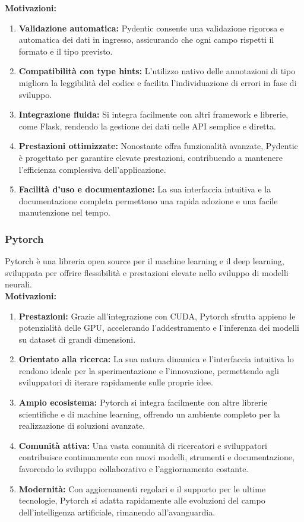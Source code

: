\textbf{Motivazioni:}
\begin{enumerate}
    \item \textbf{Validazione automatica:} Pydentic consente una validazione rigorosa e automatica dei dati in ingresso, assicurando che ogni campo rispetti il formato e il tipo previsto.
    \item \textbf{Compatibilità con type hints:} L'utilizzo nativo delle annotazioni di tipo migliora la leggibilità del codice e facilita l'individuazione di errori in fase di sviluppo.
    \item \textbf{Integrazione fluida:} Si integra facilmente con altri framework e librerie, come Flask, rendendo la gestione dei dati nelle API semplice e diretta.
    \item \textbf{Prestazioni ottimizzate:} Nonostante offra funzionalità avanzate, Pydentic è progettato per garantire elevate prestazioni, contribuendo a mantenere l'efficienza complessiva dell'applicazione.
    \item \textbf{Facilità d'uso e documentazione:} La sua interfaccia intuitiva e la documentazione completa permettono una rapida adozione e una facile manutenzione nel tempo.
\end{enumerate}


\subsubsection{Pytorch}
\label{subsubsec:pytorch}

Pytorch è una libreria open source per il machine learning e il deep learning, sviluppata per offrire flessibilità e prestazioni elevate nello sviluppo di modelli neurali.\\

\textbf{Motivazioni:}
\begin{enumerate}
    \item \textbf{Prestazioni:} Grazie all'integrazione con CUDA, Pytorch sfrutta appieno le potenzialità delle GPU, accelerando l'addestramento e l'inferenza dei modelli su dataset di grandi dimensioni.
    \item \textbf{Orientato alla ricerca:} La sua natura dinamica e l'interfaccia intuitiva lo rendono ideale per la sperimentazione e l'innovazione, permettendo agli sviluppatori di iterare rapidamente sulle proprie idee.
    \item \textbf{Ampio ecosistema:} Pytorch si integra facilmente con altre librerie scientifiche e di machine learning, offrendo un ambiente completo per la realizzazione di soluzioni avanzate.
    \item \textbf{Comunità attiva:} Una vasta comunità di ricercatori e sviluppatori contribuisce continuamente con nuovi modelli, strumenti e documentazione, favorendo lo sviluppo collaborativo e l'aggiornamento costante.
    \item \textbf{Modernità:} Con aggiornamenti regolari e il supporto per le ultime tecnologie, Pytorch si adatta rapidamente alle evoluzioni del campo dell'intelligenza artificiale, rimanendo all'avanguardia.
\end{enumerate}



